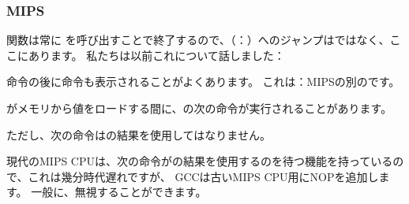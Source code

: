 ﻿\subsubsection{MIPS}




関数は常に \puts を呼び出すことで終了するので、\puts（：）へのジャンプはではなく、ここにあります。
私たちは以前これについて話しました：

命令の後に命令も表示されることがよくあります。
これは：MIPSの別のです。

がメモリから値をロードする間に、の次の命令が実行されることがあります。

ただし、次の命令はの結果を使用してはなりません。

現代のMIPS CPUは、次の命令がの結果を使用するのを待つ機能を持っているので、これは幾分時代遅れですが、
GCCは古いMIPS CPU用にNOPを追加します。
一般に、無視することができます。
